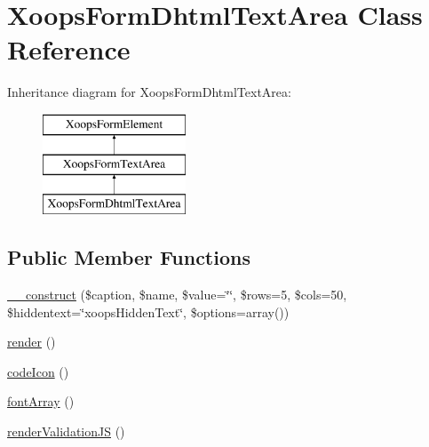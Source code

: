 \hypertarget{class_xoops_form_dhtml_text_area}{\section{Xoops\-Form\-Dhtml\-Text\-Area Class Reference}
\label{class_xoops_form_dhtml_text_area}
}
Inheritance diagram for Xoops\-Form\-Dhtml\-Text\-Area\-:\begin{figure}[H]
\begin{center}
\leavevmode
\includegraphics[height=3.000000cm]{class_xoops_form_dhtml_text_area}
\end{center}
\end{figure}
\subsection*{Public Member Functions}
\begin{DoxyCompactItemize}
\item 
\hyperlink{class_xoops_form_dhtml_text_area_a9e7541ca0c163511fd86958b47dd0d2a}{\-\_\-\-\_\-construct} (\$caption, \$name, \$value=\char`\"{}\char`\"{}, \$rows=5, \$cols=50, \$hiddentext=\char`\"{}xoops\-Hidden\-Text\char`\"{}, \$options=array())
\item 
\hyperlink{class_xoops_form_dhtml_text_area_a795991c3e8535c7ebec6241bdbfc823c}{render} ()
\item 
\hyperlink{class_xoops_form_dhtml_text_area_adddd9c5c4e0e9b45a58f845a495f7170}{code\-Icon} ()
\item 
\hyperlink{class_xoops_form_dhtml_text_area_a52c1fa60195ac60135e6e7ab1fc43ae3}{font\-Array} ()
\item 
\hyperlink{class_xoops_form_dhtml_text_area_a4551b63269780112f627fe0efce1189e}{render\-Validation\-J\-S} ()
\end{DoxyCompactItemize}
